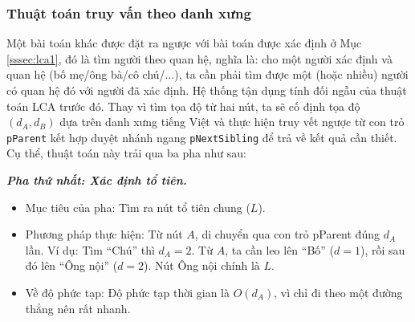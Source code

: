 \vspace*{-2\baselineskip}

\subsubsection{Thuật toán truy vấn theo danh xưng}

Một bài toán khác được đặt ra ngược với bài toán được xác định ở Mục \ref{sssec:lca1}, đó là tìm người theo quan hệ, nghĩa là: cho một người xác định và quan hệ (bố mẹ/ông bà/cô chú/...), ta cần phải tìm được một (hoặc nhiều) người có quan hệ đó với người đã xác định. Hệ thống tận dụng tính đối ngẫu của thuật toán LCA trước đó. Thay vì tìm tọa độ từ hai nút, ta sẽ cố định tọa độ $(d_A, d_B)$ dựa trên danh xưng tiếng Việt và thực hiện truy vết ngược từ con trỏ \texttt{pParent} kết hợp duyệt nhánh ngang \texttt{pNextSibling} để trả về kết quả cần thiết. Cụ thể, thuật toán này trải qua ba pha như sau:

\textbf{\textit{Pha thứ nhất: Xác định tổ tiên.}}
\begin{itemize}
	\item Mục tiêu của pha: Tìm ra nút tổ tiên chung ($L$).
	\item Phương pháp thực hiện: Từ nút $A$, di chuyển qua con trỏ pParent đúng $d_A$ lần. Ví dụ: Tìm ``Chú'' thì $d_A = 2$. Từ $A$, ta cần leo lên ``Bố'' ($d=1$), rồi sau đó lên ``Ông nội'' ($d=2$). Nút Ông nội chính là $L$.
	\item Về độ phức tạp: Độ phức tạp thời gian là $O(d_A)$, vì chỉ đi theo một đường thẳng nên rất nhanh.
\end{itemize}



